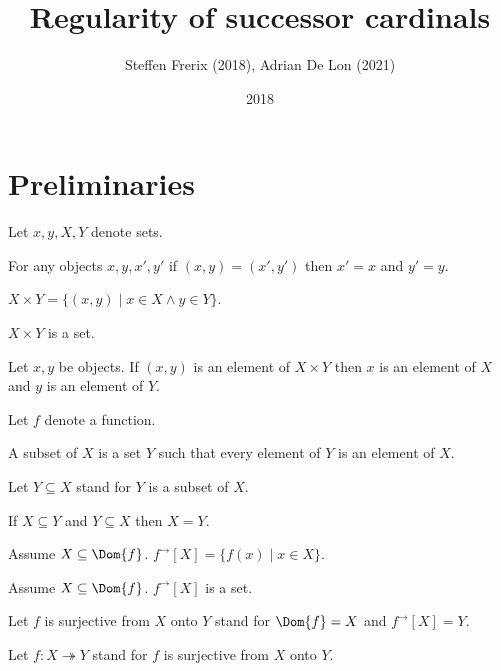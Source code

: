 \documentclass{article}
\title{Regularity of successor cardinals}
\author{Steffen Frerix (2018), Adrian De Lon (2021)}
\date{2018}
\newcommand{\Prod}[2]{#1\times #2}
\newcommand{\image}[2]{#1^{\to}[#2]}
\newcommand{\surjects}{\twoheadrightarrow}
\begin{document}

  \maketitle

  \section{Preliminaries}

  \begin{forthel}

    Let $x, y, X, Y$ denote sets.

    \begin{axiom}
      For any objects $x,y,x',y'$ if $(x, y) = (x', y')$ then $x' = x$ and $y' = y$.
    \end{axiom}

    \begin{definition}
      $\Prod{X}{Y} = \{(x,y) \mid x \in X \wedge y \in Y\}$.
    \end{definition}

    \begin{axiom}
      $\Prod{X}{Y}$ is a set.
    \end{axiom}

    \begin{lemma}
      Let $x,y$ be objects.
      If $(x,y)$ is an element of $\Prod{X}{Y}$
      then $x$ is an element of $X$ and $y$ is an element of $Y$.
    \end{lemma}

    Let $f$ denote a function.

    \begin{definition}
      A subset of $X$ is a set $Y$ such that every element of $Y$ is an element of $X$.
    \end{definition}

    Let $Y\subseteq X$ stand for $Y$ is a subset of $X$.

    \begin{axiom}[Extensionality]
      If $X\subseteq Y$ and $Y\subseteq X$ then $X = Y$.
    \end{axiom}

    \begin{definition}
      Assume $X\subseteq \Dom{f}$.
      $\image{f}{X} = \{f(x) \mid x \in X\}$.
    \end{definition}

    \begin{axiom}
      Assume $X\subseteq \Dom{f}$.
      $\image{f}{X}$ is a set.
    \end{axiom}

    Let $f$ is surjective from $X$ onto $Y$ stand for $\Dom{f} = X$ and $\image{f}{X} = Y$.

    Let $f : X \surjects Y$ stand for $f$ is surjective from $X$ onto $Y$.
  \end{forthel}
\end{document}
